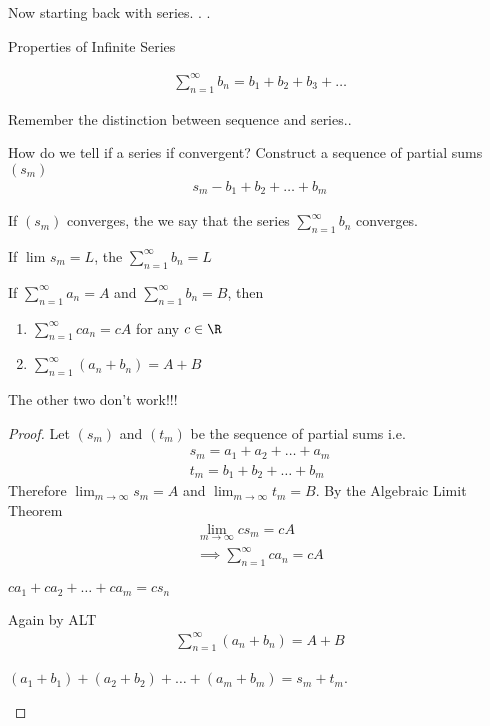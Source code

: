 Now starting back with series. . . 

Properties of Infinite Series

\begin{align}
	\sum_{n=1}^{\infty} b_n = b_1 + b_2 + b_3 + \ldots
\end{align}

\begin{note}
	Remember the distinction between sequence and series..
\end{note}

How do we tell if a series if convergent? Construct a sequence of partial sums $\left( s_m \right) $ 
\begin{align}
	s_m - b_1 + b_2 + \ldots + b_m
\end{align}

If $\left( s_m \right) $ converges, the we say that the series $\sum_{n=1}^{\infty} b_n$ converges.

If $\lim_{} s_m = L$, the $\sum_{n=1}^{\infty} b_n = L$

\begin{theorem}
	If $\sum_{n=1}^{\infty} a_n = A$ and $\sum_{n=1}^{\infty} b_n = B$, then
	\begin{enumerate}
		\item $\sum_{n=1}^{\infty} ca_n = cA$ for any $c \in \R$
		\item $\sum_{n=1}^{\infty} \left( a_n + b_n \right) = A + B$
	\end{enumerate}
\end{theorem}

\begin{note}
	The other two don't work!!!
\end{note}

\begin{proof}
	Let $\left( s_m \right) $ and $\left( t_m \right) $ be the sequence of partial sums i.e.
	\begin{align}
		s_m = a_1 + a_2 + \ldots + a_m \\
		t_m = b_1 + b_2 + \ldots + b_m
	\end{align}
	Therefore $\lim_{m \to \infty} s_m = A$ and $\lim_{m \to \infty} t_m = B$. By the Algebraic Limit Theorem
	\begin{align}
		\lim_{m \to \infty} c s_m = cA \\
		\implies \sum_{n=1}^{\infty} c a_n = cA
	\end{align}
	\begin{note}
		$c a_1 + c a_2 + \ldots + c a_m = c s_n$
	\end{note}
	Again by ALT
	\begin{align}
		\sum_{n=1}^{\infty} \left( a_n + b_n \right) = A + B
	\end{align}
	\begin{note}
		$\left( a_1 + b_1 \right) + \left( a_2 + b_2 \right) + \ldots + \left( a_m + b_m \right) = s_m + t_m$.
	\end{note}
\end{proof}




